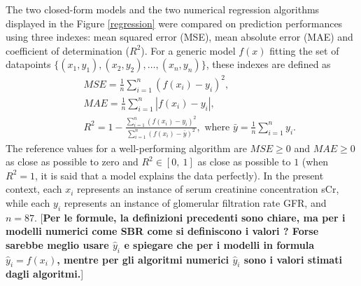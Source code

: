 \documentclass[10pt,final]{siamltex}
\begin{document}
The two closed-form models and the two numerical regression algorithms displayed in the Figure \ref{regression} were compared on prediction performances using three indexes: mean squared error (MSE), mean absolute error (MAE) and coefficient of determination ($R^2$). For a generic model $f(x)$ fitting the set of datapoints $\lbrace(x_1,y_1), (x_2,y_2), \ldots, (x_n,y_n)\rbrace$, these indexes are defined as
%
\begin{eqnarray}
&&\textit{MSE} = \frac{1}{n}\sum_{i=1}^{n}{(f(x_i)-y_i)^2},\\
&&\textit{MAE} = \frac{1}{n}\sum_{i=1}^{n}{|f(x_i)-y_i|},\\
&&R^2 = 1 - \frac{\sum_{i=1}^{n}{(f(x_i)-y_i)^2}}{\sum_{i=1}^{n}{(f(x_i)-\bar{y})^2}},
\text{ where } \bar{y} = \frac{1}{n}\sum_{i=1}^{n}{y_i}.
\end{eqnarray}
%
The reference values for a well-performing algorithm are $\textit{MSE}\geq 0$ and $\textit{MAE}\geq 0$ as close as possible to zero and $R^2 \in [0,\ 1]$ as close as possible to $1$ (when $R^2=1$, it is said that a model explains the data perfectly). In the present context, each $x_i$ represents an instance of serum creatinine concentration sCr, while each $y_i$ represents an instance of glomerular filtration rate GFR, and $n = 87$. [{\bf\red Per le formule, la definizioni precedenti sono chiare, ma per i modelli numerici come SBR come si definiscono i valori ? Forse sarebbe meglio usare $\hat{y}_i$ e spiegare che per i modelli in formula $\hat{y}_i=f(x_i)$, mentre per gli algoritmi numerici $\hat{y}_i$ sono i valori stimati dagli algoritmi.}]
\end{document}
